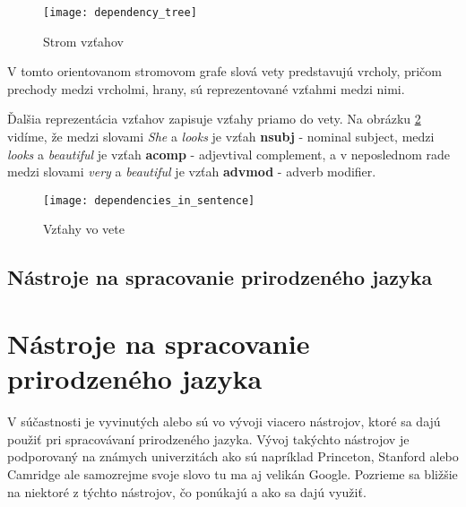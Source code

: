 \begin{figure}[H]
\begin{center}\texttt{[image: dependency\_tree]}\end{center}
\caption[Strom vzťahov]{Strom vzťahov}\label{fig:dependency_tree}
\end{figure}

V tomto orientovanom stromovom grafe slová vety predstavujú vrcholy, pričom prechody medzi vrcholmi, hrany, sú reprezentované vzťahmi medzi nimi.

Ďalšia reprezentácia vzťahov zapisuje vzťahy priamo do vety. Na obrázku \ref{fig:dependencies_in_sentence} vidíme, že medzi slovami \textit{She} a \textit{looks} je vzťah \textbf{nsubj} - nominal subject, medzi \textit{looks} a \textit{beautiful} je vzťah \textbf{acomp} - adjevtival complement, a v neposlednom rade medzi slovami \textit{very} a \textit{beautiful} je vzťah \textbf{advmod} - adverb modifier.

\begin{figure}[H]
\begin{center}\texttt{[image: dependencies\_in\_sentence]}\end{center}
\caption[Vzťahy vo vete]{Vzťahy vo vete}\label{fig:dependencies_in_sentence}
\end{figure}

{
	\subsection{Nástroje na spracovanie prirodzeného jazyka}
}
{
	\section{Nástroje na spracovanie prirodzeného jazyka}
}
\label{subsec:nlp_nastroje}
V súčastnosti je vyvinutých alebo sú vo vývoji viacero nástrojov, ktoré sa dajú použiť pri spracovávaní prirodzeného jazyka. Vývoj takýchto nástrojov je podporovaný na známych univerzitách ako sú napríklad Princeton, Stanford alebo Camridge ale samozrejme svoje slovo tu ma aj velikán Google. Pozrieme sa bližšie na niektoré z týchto nástrojov, čo ponúkajú a ako sa dajú využiť.

